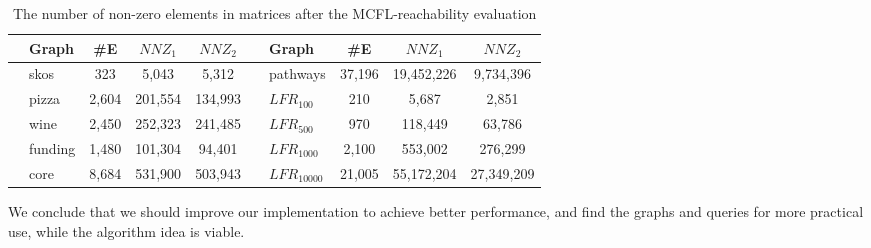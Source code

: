 {\setlength{\tabcolsep}{0.3em}
\begin{table}[ht]
\centering
\caption{The number of non-zero elements in matrices after the MCFL-reachability evaluation}
\label{tbl:tableNNZ}
\begin{tabular}{| c | p{1cm} | c | c | c || c | p{1.3cm} | c | c | c |}
    \hline
      &  Graph               & \#E  & $NNZ_1$  & $NNZ_2$ &  & Graph  & \#E     & $NNZ_1$    & $NNZ_2$ \\
       \hline
       \hline
    \parbox[t]{2mm}{}
      & \small{skos}                 & 323     & 5,043  & 5,312 &
     \parbox[t]{2mm}{} & \small{pathways}                 & 37,196  & 19,452,226 &   9,734,396   \\
      & \small{pizza}                    & 2,604    & 201,554  & 134,993 &\parbox[t]{2mm}{} & $LFR_{100}$ & 210 & 5,687 & 2,851      \\
      & \small{wine}                     & 2,450    & 252,323  & 241,485 & & $LFR_{500}$ & 970 & 118,449 & 63,786      \\
      & \small{funding}                  & 1,480    & 101,304  & 94,401 & & $LFR_{1000}$ & 2,100 & 553,002 & 276,299     \\
      & \small{core}                     & 8,684   & 531,900  &  503,943 & & $LFR_{10000}$ & 21,005&  55,172,204 & 27,349,209      \\
      \hline
  \end{tabular}
\end{table}
}

We conclude that we should improve our implementation to achieve better performance, and find the graphs and queries for more practical use, while the algorithm idea is viable.

